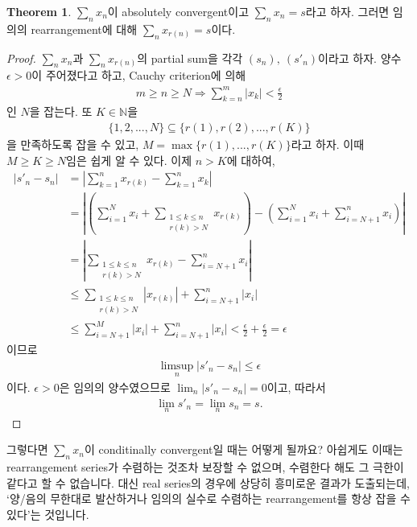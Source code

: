 \documentclass[12pt]{article}
\theoremstyle{definition}
\newtheorem{thm}{Theorem}[section]
\def\NN{\mathbb{N}}
\def\eps{\epsilon}
\newcommand{\abs}[1]{\left\vert#1\right\vert}
\begin{document}
	\begin{thm}
		\(\sum_n x_n\)이 absolutely convergent이고 \(\sum_n x_n = s\)라고 하자. 그러면 임의의 rearrangement에 대해 \(\sum_n x_{r(n)} = s\)이다. 
	\end{thm}
	\begin{proof}
		\(\sum_n x_n\)과 \(\sum_n x_{r(n)}\)의 partial sum을 각각 \((s_n), \: (s'_n)\)이라고 하자. 양수 \(\eps > 0\)이 주어졌다고 하고, Cauchy criterion에 의해
		\begin{align*}
			m \ge n \ge N \Rightarrow \sum_{k=n}^{m} \abs{x_k} < \frac{\eps}{2}
		\end{align*}
		인 \(N\)을 잡는다. 또 \(K \in \NN\)을
		\begin{align*}
			\{1, 2, ..., N\} \subseteq \{r(1), r(2), ..., r(K)\}
		\end{align*}
		을 만족하도록 잡을 수 있고, \(M = \max\{r(1), ..., r(K)\}\)라고 하자. 이때 \(M \ge K \ge N\)임은 쉽게 알 수 있다. 이제 \(n > K\)에 대하여,
		\begin{align*}
			\abs{s'_n - s_n} &= \abs{\sum_{k=1}^{n} x_{r(k)} - \sum_{k=1}^n x_k}\\
			&= \abs{( \sum_{i=1}^N x_i + \sum_{\substack{1 \le k \le n \\ r(k) > N}} x_{r(k)}) - (\sum_{i=1}^N x_i + \sum_{i=N+1}^n x_i)}\\
			&= \abs{\sum_{\substack{1 \le k \le n \\ r(k) > N}} x_{r(k)} - \sum_{i=N+1}^n x_i}\\
			& \le \sum_{\substack{1 \le k \le n \\ r(k) > N}} \abs{x_{r(k)}} + \sum_{i=N+1}^n \abs{x_i}\\
			& \le \sum_{i=N+1}^M \abs{x_i} + \sum_{i=N+1}^n \abs{x_i} < \frac{\eps}{2} + \frac{\eps}{2} = \eps
		\end{align*}
		이므로
		\begin{align*}
			\limsup_n \abs{s'_n - s_n} \le \eps
		\end{align*}
		이다. \(\eps > 0\)은 임의의 양수였으므로 \(\lim_n \abs{s'_n - s_n} = 0\)이고, 따라서
		\begin{align*}
			\lim_n s'_n = \lim_n s_n = s.
		\end{align*}
	\end{proof}

그렇다면 \(\sum_n x_n\)이 conditinally convergent일 때는 어떻게 될까요? 아쉽게도 이때는 rearrangement series가 수렴하는 것조차 보장할 수 없으며, 수렴한다 해도 그 극한이 같다고 할 수 없습니다. 대신 real series의 경우에 상당히 흥미로운 결과가 도출되는데, `양/음의 무한대로 발산하거나 임의의 실수로 수렴하는 rearrangement를 항상 잡을 수 있다'는 것입니다.
\end{document}
